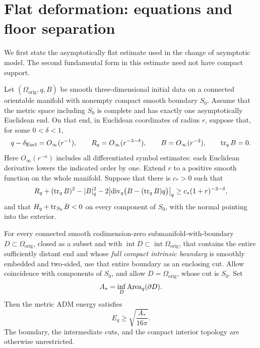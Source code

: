 \section{Flat deformation: equations and floor separation}
\label{sec:fl-system-floor}

We first state the asymptotically flat estimate used in the change of
asymptotic model.  The second fundamental form in this estimate need not
have compact support.

\begin{theorem}
\label{thm:fl-deformation}
Let \((\Omega_{\mathrm{orig}},q,B)\) be smooth three-dimensional initial
data on a connected orientable manifold with nonempty compact smooth
boundary \(S_0\).  Assume that the metric space including \(S_0\) is
complete and has exactly one asymptotically Euclidean end.  On that end,
in Euclidean coordinates of radius \(r\), suppose that, for some
\(0<\delta<1\),
\begin{equation}
\label{eq:fl-data-decay}
 q-\delta_{\mathrm{Eucl}}=O_\infty(r^{-1}),\qquad
 R_q=O_\infty(r^{-3-\delta}),\qquad
 B=O_\infty(r^{-2}),\qquad \operatorname{tr}_qB=0.
\end{equation}
Here \(O_\infty(r^{-a})\) includes all differentiated symbol estimates:
each Euclidean derivative lowers the indicated order by one.  Extend
\(r\) to a positive smooth function on the whole manifold.  Suppose that
there is \(c_*>0\) such that
\begin{equation}
\label{eq:fl-strict-dec}
 R_q+(\operatorname{tr}_q B)^2-\lvert B\rvert_q^2
 -2\bigl\lvert\operatorname{div}_q
          \bigl(B-(\operatorname{tr}_qB)q\bigr)\bigr\rvert_q
 \ge c_*(1+r)^{-3-\delta},
\end{equation}
and that \(H_q+\operatorname{tr}_{S_0}B<0\) on every component of \(S_0\), with the
normal pointing into the exterior.

For every connected smooth codimension-zero submanifold-with-boundary
\(D\subset\Omega_{\mathrm{orig}}\), closed as a subset and with
\(\operatorname{int}D\subset\operatorname{int}\Omega_{\mathrm{orig}}\),
that contains the entire sufficiently distant end and whose
\emph{full compact intrinsic boundary} is smoothly embedded and
two-sided, use that entire boundary as an enclosing cut.
Allow coincidence with components of \(S_0\), and allow
\(D=\Omega_{\mathrm{orig}}\), whose cut is \(S_0\).  Set
\[
 A_*=\inf_D\operatorname{Area}_q(\partial D).
\]
Then the metric ADM energy satisfies
\[
 E_q\ge \sqrt{\frac{A_*}{16\pi}}.
\]
The boundary, the intermediate cuts, and the compact interior topology
are otherwise unrestricted.
\end{theorem}


